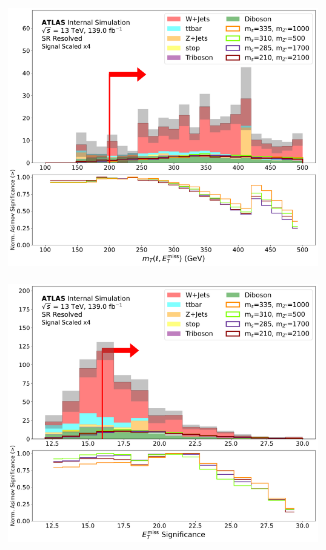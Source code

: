   
    \begin{figure}[htbp]
  \centering
    \begin{subfigure}[t]{0.48\textwidth}
    \centering
     \includegraphics[width = 0.9\textwidth]{Figures/5/SR1L_Resolved/mT_lep_met_normSig_N_1.pdf}
    \caption{\mtlepmet}
    \end{subfigure}
    \begin{subfigure}[t]{0.48\textwidth}
    \centering
     \includegraphics[width = 0.9\textwidth]{Figures/5/SR1L_Resolved/MetTST_Significance_normSig_N_1.pdf}
    \caption{\metsig}
    \end{subfigure}
    \begin{subfigure}[t]{0.48\textwidth}
    \centering

\end{subfigure}
\end{figure}
